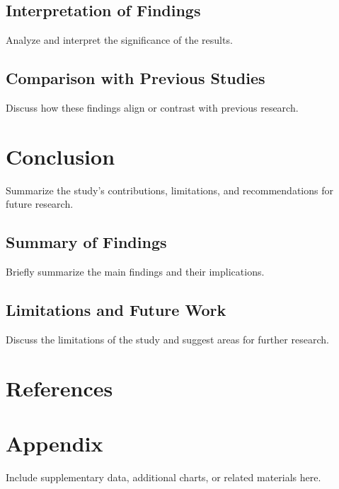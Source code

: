 \documentclass[12pt, a4paper]{report}
\begin{document}
\section{Interpretation of Findings}
Analyze and interpret the significance of the results.

\section{Comparison with Previous Studies}
Discuss how these findings align or contrast with previous research.

\chapter{Conclusion}
Summarize the study’s contributions, limitations, and recommendations for future research.
\section{Summary of Findings}
Briefly summarize the main findings and their implications.

\section{Limitations and Future Work}
Discuss the limitations of the study and suggest areas for further research.

\chapter*{References}
\printbibliography

\appendix
\chapter{Appendix}
Include supplementary data, additional charts, or related materials here.
\end{document}
